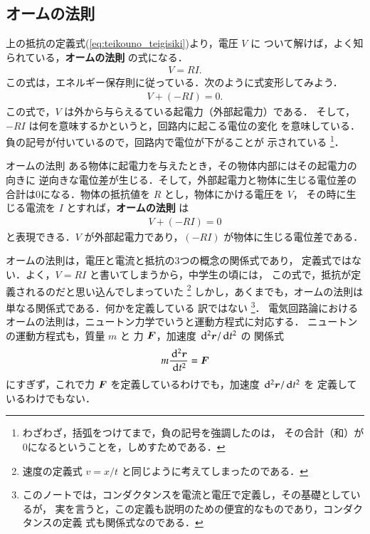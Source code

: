         \subsection{オームの法則}
            上の抵抗の定義式(\ref{eq:teikouno_teigisiki})より，電圧 $V$ に
            ついて解けば，よく知られている，\textbf{オームの法則} の式になる．
                \begin{align}
                    V = RI.
                \end{align}
            この式は，エネルギー保存則に従っている．次のように式変形してみよう．
                \begin{align}
                    V +(- RI) = 0.
                \end{align}
            この式で，$V$ は外から与らえるている起電力（外部起電力）である．
            そして，$-RI$ は何を意味するかというと，回路内に起こる電位の変化
            を意味している．負の記号が付いているので，回路内で電位が下がることが
            示されている
                \footnote{
                    わざわざ，括弧をつけてまで，負の記号を強調したのは，
                    その合計（和）が0になるということを，しめすためである．
                }．
            \begin{myshadebox}{オームの法則}
                ある物体に起電力を与えたとき，その物体内部にはその起電力の向きに
                逆向きな電位差が生じる．そして，外部起電力と物体に生じる電位差の
                合計は0になる．物体の抵抗値を $R$ とし，物体にかける電圧を $V$，
                その時に生じる電流を $I$ とすれば，\textbf{オームの法則} は
                    \begin{align}
                        V +(- RI) = 0
                    \end{align}
                と表現できる．$V$ が外部起電力であり，$(-RI)$ が物体に生じる電位差である．
            \end{myshadebox}

            オームの法則は，電圧と電流と抵抗の3つの概念の関係式であり，
            定義式ではない．よく，$V=RI$ と書いてしまうから，中学生の頃には，
            この式で，抵抗が定義されるのだと思い込んでしまっていた
                \footnote{
                    速度の定義式 $v=x/t$ と同じように考えてしまったのである．
                }
            しかし，あくまでも，オームの法則は単なる関係式である．何かを定義している
            訳ではない
                \footnote{
                    このノートでは，コンダクタンスを電流と電圧で定義し，その基礎としているが，
                    実を言うと，この定義も説明のための便宜的なものであり，コンダクタンスの定義
                    式も関係式なのである．
                }．
            電気回路論におけるオームの法則は，ニュートン力学でいうと運動方程式に対応する．
            ニュートンの運動方程式も，質量 $m$ と 力 $\boldsymbol{F}$，加速度 $\,\mathrm{d}^{2} \boldsymbol{r}/\,\mathrm{d} t^{2}$ の
            関係式
                \begin{equation*}
                    m \frac{\,\mathrm{d}^{2} \boldsymbol{r}}{\,\mathrm{d} t^{2}} = \boldsymbol{F}
                \end{equation*}
            にすぎず，これで力 $\boldsymbol{F}$ を定義しているわけでも，加速度 $\,\mathrm{d}^{2} \boldsymbol{r}/\,\mathrm{d} t^{2}$ を
            定義しているわけでもない．


